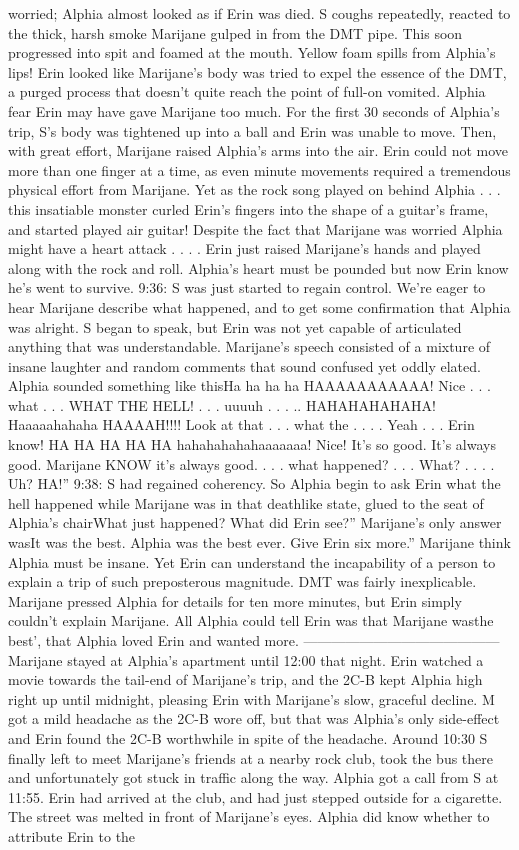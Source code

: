 \documentclass[12pt]{book}
\begin{document}
worried; Alphia almost looked as if Erin was died. S coughs repeatedly, reacted to the thick, harsh smoke Marijane gulped in from the DMT pipe. This soon progressed into spit and foamed at the mouth. Yellow foam spills from Alphia's lips! Erin looked like Marijane's body was tried to expel the essence of the DMT, a purged process that doesn't quite reach the point of full-on vomited. Alphia fear Erin may have gave Marijane too much. For the first 30 seconds of Alphia's trip, S's body was tightened up into a ball and Erin was unable to move. Then, with great effort, Marijane raised Alphia's arms into the air. Erin could not move more than one finger at a time, as even minute movements required a tremendous physical effort from Marijane. Yet as the rock song played on behind Alphia  . . .  this insatiable monster curled Erin's fingers into the shape of a guitar's frame, and started played air guitar! Despite the fact that Marijane was worried Alphia might have a heart attack . . . . Erin just raised Marijane's hands and played along with the rock and roll. Alphia's heart must be pounded but now Erin know he's went to survive. 9:36: S was just started to regain control. We're eager to hear Marijane describe what happened, and to get some confirmation that Alphia was alright. S began to speak, but Erin was not yet capable of articulated anything that was understandable. Marijane's speech consisted of a mixture of insane laughter and random comments that sound confused yet oddly elated. Alphia sounded something like thisHa ha ha ha HAAAAAAAAAAA! Nice . . .  what . . .  WHAT THE HELL! . . .  uuuuh . . . .. HAHAHAHAHAHA! Haaaaahahaha HAAAAH!!!! Look at that . . .  what the . . . . Yeah . . .  Erin know! HA HA HA HA HA hahahahahahaaaaaaa! Nice! It's so good. It's always good. Marijane KNOW it's always good.  . . .  what happened?  . . .  What?  . . . . Uh? HA!'' 9:38: S had regained coherency. So Alphia begin to ask Erin what the hell happened while Marijane was in that deathlike state, glued to the seat of Alphia's chairWhat just happened? What did Erin see?'' Marijane's only answer wasIt was the best. Alphia was the best ever. Give Erin six more.'' Marijane think Alphia must be insane. Yet Erin can understand the incapability of a person to explain a trip of such preposterous magnitude. DMT was fairly inexplicable. Marijane pressed Alphia for details for ten more minutes, but Erin simply couldn't explain Marijane. All Alphia could tell Erin was that Marijane wasthe best', that Alphia loved Erin and wanted more. ------------------------------------------ Marijane stayed at Alphia's apartment until 12:00 that night. Erin watched a movie towards the tail-end of Marijane's trip, and the 2C-B kept Alphia high right up until midnight, pleasing Erin with Marijane's slow, graceful decline. M got a mild headache as the 2C-B wore off, but that was Alphia's only side-effect and Erin found the 2C-B worthwhile in spite of the headache. Around 10:30 S finally left to meet Marijane's friends at a nearby rock club, took the bus there and unfortunately got stuck in traffic along the way. Alphia got a call from S at 11:55. Erin had arrived at the club, and had just stepped outside for a cigarette. The street was melted in front of Marijane's eyes. Alphia did know whether to attribute Erin to the 
\end{document}
